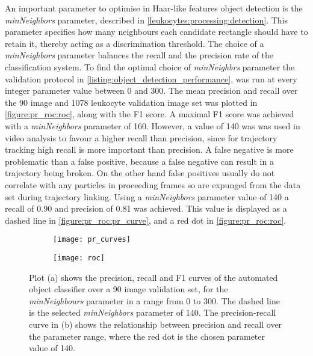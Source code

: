 An important parameter to optimise in Haar-like features object detection is the \emph{minNeighbors} parameter, described in \autoref{leukocytes:processing:detection}. This parameter specifies how many neighbours each candidate rectangle should have to retain it, thereby acting as a discrimination threshold. The choice of a \emph{minNeighbors} parameter balances the recall and the precision rate of the classification system. To find the optimal choice of \emph{minNeighbrs} parameter the validation protocol in \autoref{listing:object_detection_performance}, was run at every integer parameter value between 0 and 300. The mean precision and recall over the 90 image and 1078 leukocyte validation image set was plotted in \autoref{figure:pr_roc:roc}, along with the F1 score. A maximal F1 score was achieved with a \emph{minNeighbors} parameter of 160. However, a value of 140 was was used in video analysis to favour a higher recall than precision, since for trajectory tracking high recall is more important than precision. A false negative is more problematic than a false positive, because a false negative can result in a trajectory being broken. On the other hand false positives usually do not correlate with any particles in proceeding frames so are expunged from the data set during trajectory linking. Using a \emph{minNeighbors} parameter value of 140 a recall of 0.90 and precision of 0.81 was achieved. This value is displayed as a dashed line in \autoref{figure:pr_roc:pr_curve}, and a red dot in \autoref{figure:pr_roc:roc}.

\begin{figure}[htbp]{}
	\centering
	\begin{subfigure}[b]{0.72\linewidth}
		\texttt{[image: pr\_curves]}
		\caption{}
		\label{figure:pr_roc:pr_curve}
	\end{subfigure}
	\begin{subfigure}[b]{0.74\linewidth}
		\texttt{[image: roc]}
		\caption{}
		\label{figure:pr_roc:roc}
	\end{subfigure}
\caption[Precision, recall and F1 score over parameter range]{Plot (a) shows the precision, recall and F1 curves of the automated object classifier over a 90 image validation set, for the \emph{minNeighbours} parameter in a range from 0 to 300. The dashed line is the selected \emph{minNeighbors} parameter of 140. The precision-recall curve in (b) shows the relationship between precision and recall over the parameter range, where the red dot is the chosen parameter value of 140.}
\label{figure:pr_roc}
\end{figure}

